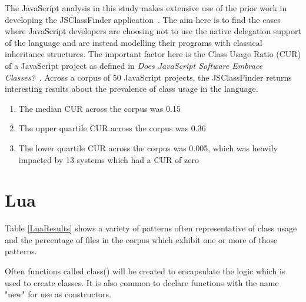 The JavaScript analysis in this study makes extensive use of the prior work in developing the JSClassFinder application~\cite{JSClassFinder}. The aim here is to find the cases where JavaScript developers are choosing not to use the native delegation support of the language and are instead modelling their programs with classical inheritance structures. The important factor here is the Class Usage Ratio (CUR) of a JavaScript project as defined in \textit{Does JavaScript Software Embrace Classes?~\cite{JSClassFinder}}. Across a corpus of 50 JavaScript projects, the JSClassFinder returns interesting results about the prevalence of class usage in the language.
\begin{enumerate}
	\item The median CUR across the corpus was 0.15
	\item The upper quartile CUR across the corpus was 0.36
	\item The lower quartile CUR across the corpus was 0.005, which was heavily impacted by 13 systems which had a CUR of zero
\end{enumerate}
\section{Lua}
Table \ref{LuaResults} shows a variety of patterns often representative of class usage and the percentage of files in the corpus which exhibit one or more of those patterns.\newline

Often functions called class() will be created to encapsulate the  logic which is used to create classes. It is also common to declare functions with the name "new" for use as constructors.

